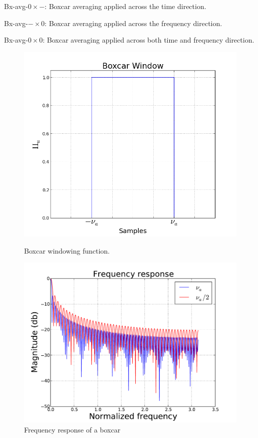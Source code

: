 \documentclass[useAMS,usenatbib]{mn2e}
\begin{document}
Bx-avg-$0\times -$: Boxcar averaging applied across the time direction.

Bx-avg-$-\times 0$: Boxcar averaging applied across the frequency direction. 

Bx-avg-$0\times 0$: Boxcar averaging applied across both time and frequency direction.
\begin{figure}
  \centering
  \begin{minipage}{0.36\linewidth}\includegraphics[width=1\textwidth]{./Figures/rect.png}\caption{Boxcar windowing 
function.}\label{fig:fig_box}\end{minipage}
\hspace{1cm}
\begin{minipage}{0.36\linewidth}\includegraphics[width=1\textwidth]{./Figures/freq_resp_box.pdf}\caption{Frequency response of a boxcar 
}
\end{minipage}
\end{figure}
\end{document}
